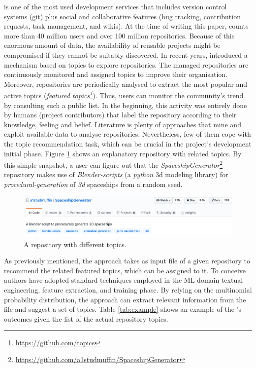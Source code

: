 \GH is one of the most used development services that includes version control 
systems (\ie git) plus social and collaborative features (\eg bug tracking, 
contribution requests, task management, and wikis).
At the time of writing this paper, \GH counts more than 40 million users and 
over 100 million repositories. Because of this enormous amount of data, the 
availability of reusable projects might be compromised if they cannot be 
suitably discovered. In recent years, \GH introduced a  mechanism based on 
topics to explore repositories. The managed \GH repositories are continuously 
monitored and assigned topics to improve their organisation. Moreover, 
repositories are periodically analysed to extract the most popular and active 
topics (\ie \emph{featured topics\footnote{\url{https://github.com/topics}}}). 
Thus, users can monitor the community's trend by consulting such a public list. 
In the beginning, this activity was entirely done by humans (\ie project 
contributors) that label the repository according to their knowledge, feeling 
and belief. Literature is plenty of approaches that mine and exploit available 
data to analyse repositories. Nevertheless, few of them cope with the topic 
recommendation task, which can be crucial in the project's development initial 
phase. Figure \ref{fig:SpaceshipGenerator} shows an explanatory repository with 
related topics. By this simple snapshot, a \GH user can figure out that the 
\emph{SpaceshipGenerator}\footnote{\label{note:spaceship}\url{https://github.com/a1studmuffin/SpaceshipGenerator}}
 repository makes use of \emph{Blender-scripts} (\ie a \emph{python} 3d 
modeling library) for \emph{procedural-generation} of \emph{3d} spaceships from 
a random seed.


\begin{figure}[h!]
    \centering
    \includegraphics[width=0.99\linewidth]{figs/SpaceshipGenerator.png}
    \caption{A \GH repository with different topics.}
    \label{fig:SpaceshipGenerator}
\end{figure}


As previously mentioned, the \MNB approach takes as input \RM file of a given 
repository to recommend the related featured topics, which can be assigned to 
it. To conceive  \MNB authors have adopted standard techniques employed in the 
ML domain \ie textual engineering, feature extraction, and training phase. By 
relying on the multinomial probability distribution, the approach can extract 
relevant information from the \RM file and suggest a set of topics. Table 
\ref{tab:example} shows an example of the \MNB's outcomes given the list of the 
actual repository topics. 

